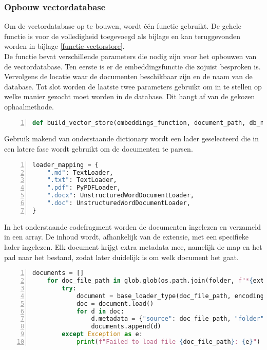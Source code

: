 \subsubsection{Opbouw vectordatabase}
Om de vectordatabase op te bouwen, wordt één functie gebruikt. De gehele functie is voor de volledigheid toegevoegd als bijlage en kan teruggevonden worden in bijlage \ref{functie-vectorstore}.
\\[1em]
De functie bevat verschillende parameters die nodig zijn voor het opbouwen van de vectordatabase. Ten eerste is er de embeddingsfunctie die zojuist besproken is. Vervolgens de locatie waar de documenten beschikbaar zijn en de naam van de database. Tot slot worden de laatste twee parameters gebruikt om in te stellen op welke manier gezocht moet worden in de database. Dit hangt af van de gekozen ophaalmethode.

\begin{lstlisting}[basicstyle=\small, frame=single, breaklines=true, postbreak=\mbox{\textcolor{red}{$\hookrightarrow$}\space}, escapeinside ={\%,}, escapechar={!},
    numbers=left, language=Python, caption=Vector store functie met parameters]
def build_vector_store(embeddings_function, document_path, db_name, search_type, search_kwargs):
\end{lstlisting}

Gebruik makend van onderstaande dictionary wordt een lader geselecteerd die in een latere fase wordt gebruikt om de documenten te parsen.

\begin{lstlisting}[basicstyle=\small, frame=single, breaklines=true, postbreak=\mbox{\textcolor{red}{$\hookrightarrow$}\space}, escapeinside ={\%,}, escapechar={!},
    numbers=left, language=Python, caption=Mapping van bestandsextensies naar de bijbehorende document loaders]
loader_mapping = {
    ".md": TextLoader,
    ".txt": TextLoader,
    ".pdf": PyPDFLoader,
    ".docx": UnstructuredWordDocumentLoader,
    ".doc": UnstructuredWordDocumentLoader,
}
\end{lstlisting}

In het onderstaande codefragment worden de documenten ingelezen en verzameld in een array. De inhoud wordt, afhankelijk van de extensie, met een specifieke lader ingelezen. Elk document krijgt extra metadata mee, namelijk de map en het pad naar het bestand, zodat later duidelijk is om welk document het gaat.

\begin{lstlisting}[basicstyle=\small, frame=single, breaklines=true, postbreak=\mbox{\textcolor{red}{$\hookrightarrow$}\space}, escapeinside ={\%,}, escapechar={!},
    numbers=left, language=Python, caption=Inladen en parsen van documenten per bestandstype met toevoeging van metadata]
    documents = []
    for doc_file_path in glob.glob(os.path.join(folder, f"*{ext}")):
        try:
            document = base_loader_type(doc_file_path, encoding="utf-8")
            doc = document.load()
            for d in doc:
                d.metadata = {"source": doc_file_path, "folder": folder}
                documents.append(d)
        except Exception as e:
            print(f"Failed to load file {doc_file_path}: {e}")
\end{lstlisting}

